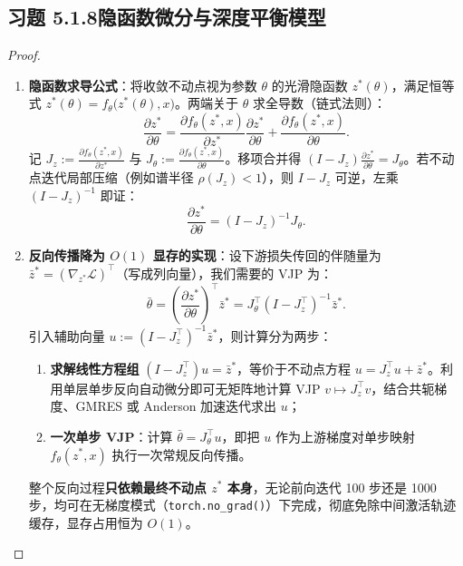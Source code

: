 \subsection*{习题 5.1.8\quad 隐函数微分与深度平衡模型}
\begin{proof}
\begin{enumerate}[label=(\arabic*), leftmargin=1.8em]
  \item \textbf{隐函数求导公式}：将收敛不动点视为参数 $\theta$ 的光滑隐函数 $z^*(\theta)$，满足恒等式 $z^*(\theta) = f_\theta\big(z^*(\theta), x\big)$。两端关于 $\theta$ 求全导数（链式法则）：
  \[
    \frac{\partial z^*}{\partial \theta}
    = \frac{\partial f_\theta(z^*, x)}{\partial z^*} \frac{\partial z^*}{\partial \theta}
    + \frac{\partial f_\theta(z^*, x)}{\partial \theta}.
  \]
  记 $J_z := \frac{\partial f_\theta(z^*, x)}{\partial z^*}$ 与 $J_\theta := \frac{\partial f_\theta(z^*, x)}{\partial \theta}$。移项合并得 $(I - J_z)\frac{\partial z^*}{\partial \theta} = J_\theta$。若不动点迭代局部压缩（例如谱半径 $\rho(J_z) < 1$），则 $I - J_z$ 可逆，左乘 $(I - J_z)^{-1}$ 即证：
  \[
    \frac{\partial z^*}{\partial \theta} = (I - J_z)^{-1} J_\theta.
  \]

  \item \textbf{反向传播降为 $O(1)$ 显存的实现}：设下游损失传回的伴随量为 $\bar{z}^* = (\nabla_{z^*} \mathcal{L})^\top$（写成列向量），我们需要的 VJP 为：
  \[
    \bar{\theta} = \left(\frac{\partial z^*}{\partial \theta}\right)^\top \bar{z}^*
    = J_\theta^\top (I - J_z^\top)^{-1} \bar{z}^*.
  \]
  引入辅助向量 $u := (I - J_z^\top)^{-1} \bar{z}^*$，则计算分为两步：
  \begin{enumerate}[label=(\roman*), leftmargin=1.6em]
    \item \textbf{求解线性方程组} $(I - J_z^\top) u = \bar{z}^*$，等价于不动点方程 $u = J_z^\top u + \bar{z}^*$。利用单层单步反向自动微分即可无矩阵地计算 VJP $v \mapsto J_z^\top v$，结合共轭梯度、GMRES 或 Anderson 加速迭代求出 $u$；
    \item \textbf{一次单步 VJP}：计算 $\bar{\theta} = J_\theta^\top u$，即把 $u$ 作为上游梯度对单步映射 $f_\theta(z^*, x)$ 执行一次常规反向传播。
  \end{enumerate}
  整个反向过程\textbf{只依赖最终不动点 $z^*$ 本身}，无论前向迭代 100 步还是 1000 步，均可在无梯度模式（\texttt{torch.\allowbreak no\_grad()}）下完成，彻底免除中间激活轨迹缓存，显存占用恒为 $O(1)$。
\end{enumerate}
\end{proof}

